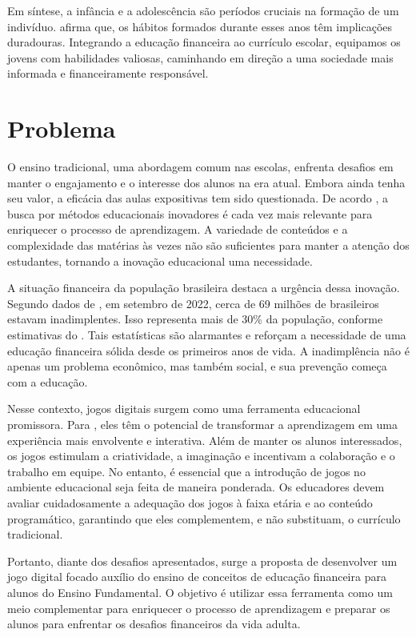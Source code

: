 Em síntese, a infância e a adolescência são períodos cruciais na formação de um indivíduo. \cite{AbuBakarAh2016Importance} afirma que, os hábitos formados durante esses anos têm implicações duradouras. Integrando a educação financeira ao currículo escolar, equipamos os jovens com habilidades valiosas, caminhando em direção a uma sociedade mais informada e financeiramente responsável.


\section{Problema}

O ensino tradicional, uma abordagem comum nas escolas, enfrenta desafios em manter o engajamento e o interesse dos alunos na era atual. Embora ainda tenha seu valor, a eficácia das aulas expositivas tem sido questionada. De acordo \cite{fortes2023aprendizagem}, a busca por métodos educacionais inovadores é cada vez mais relevante para enriquecer o processo de aprendizagem. A variedade de conteúdos e a complexidade das matérias às vezes não são suficientes para manter a atenção dos estudantes, tornando a inovação educacional uma necessidade.

A situação financeira da população brasileira destaca a urgência dessa inovação. Segundo dados de , em setembro de 2022, cerca de 69 milhões de brasileiros estavam inadimplentes. Isso representa mais de 30\% da população, conforme estimativas do \cite{IBGE_populacao}. Tais estatísticas são alarmantes e reforçam a necessidade de uma educação financeira sólida desde os primeiros anos de vida. A inadimplência não é apenas um problema econômico, mas também social, e sua prevenção começa com a educação.

Nesse contexto, jogos digitais surgem como uma ferramenta educacional promissora. Para \cite{Cruz_Araujo_Andrye_Galvao_Madeira_2022}, eles têm o potencial de transformar a aprendizagem em uma experiência mais envolvente e interativa. Além de manter os alunos interessados, os jogos estimulam a criatividade, a imaginação e incentivam a colaboração e o trabalho em equipe. No entanto, é essencial que a introdução de jogos no ambiente educacional seja feita de maneira ponderada. Os educadores devem avaliar cuidadosamente a adequação dos jogos à faixa etária e ao conteúdo programático, garantindo que eles complementem, e não substituam, o currículo tradicional.

Portanto, diante dos desafios apresentados, surge a proposta de desenvolver um jogo digital focado auxílio do ensino de conceitos de educação financeira para alunos do Ensino Fundamental. O objetivo é utilizar essa ferramenta como um meio complementar para enriquecer o processo de aprendizagem e preparar os alunos para enfrentar os desafios financeiros da vida adulta.

